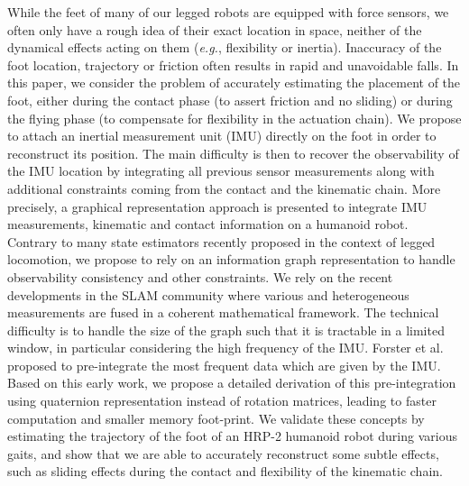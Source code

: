 %
%
While the feet of many of our legged robots are equipped with force sensors, we often only have a rough idea of their exact location in space, neither of the dynamical effects acting on them ({\em e.g.}, flexibility or inertia).
Inaccuracy of the foot location, trajectory or friction often results in rapid and unavoidable falls.
In this paper, we consider the problem of accurately estimating the placement of the foot, either during the contact phase (to assert friction and no sliding) or during the flying phase (to compensate for flexibility in the actuation chain).
We propose to attach an inertial measurement unit (IMU) directly on the foot in order to reconstruct its position.
The main difficulty is then to recover the observability of the IMU location by integrating all previous sensor measurements along with additional constraints coming from the contact and the kinematic chain.
More precisely, a graphical representation approach is presented to integrate IMU measurements, kinematic and contact information on a humanoid robot. 
Contrary to many state estimators recently proposed in the context of legged locomotion, we propose to rely on an information graph representation to handle observability consistency and other constraints.
We rely on the recent developments in the SLAM community where various and heterogeneous measurements are fused in a coherent mathematical framework.
The technical difficulty is to handle the size of the graph such that it is tractable in a limited window, in particular considering the high frequency of the IMU.
Forster et al. proposed to pre-integrate the most frequent data which are given by the IMU.
Based on this early work, we propose a detailed derivation of this pre-integration using quaternion representation instead of rotation matrices, leading to faster computation and smaller memory foot-print.
We validate these concepts by estimating the trajectory of the foot of an HRP-2 humanoid robot during various gaits, and show that we are able to accurately reconstruct some subtle effects, such as sliding effects during the contact and flexibility of the kinematic chain.
